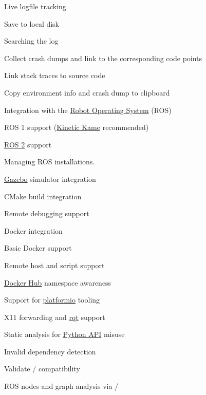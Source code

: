\begin{multicols}{2}
\begin{todolist}
\begin{todolist}
\item Live logfile tracking
\item Save to local disk
\item Searching the log
\end{todolist}
\item Collect crash dumps and link to the corresponding code points
\begin{todolist}
\item Link stack traces to source code
\item Copy environment info and crash dump to clipboard
\end{todolist}
\item Integration with the \href{https://www.ros.org}{Robot Operating System} (ROS)
\begin{todolist}
\item[\done] ROS 1 support (\href{https://wiki.ros.org/kinetic}{Kinetic Kame} recommended)
\item \href{https://github.com/ros2/ros2/wiki}{ROS 2} support
\item[\done] Managing ROS installations.
\end{todolist}
\item[\done] \href{http://gazebosim.org/}{Gazebo} simulator integration
\item CMake build integration
\item Remote debugging support
\item Docker integration
\begin{todolist}
\item[\done] Basic Docker support
\item Remote host and script support
\item \href{https://hub.docker.com}{Docker Hub} namespace awareness
\item Support for \href{https://platformio.org}{platformio} tooling
\item X11 forwarding and \href{https://wiki.ros.org/rqt}{rqt} support
\end{todolist}
\item Static analysis for \href{https://wiki.ros.org/rospy}{Python API} misuse
\begin{todolist}
\item[\done] Invalid dependency detection
\item Validate / compatibility
\item ROS nodes and graph analysis via \href{https://wiki.ros.org/rosdep}{}/\href{https://wiki.ros.org/rqt_dep}{}

\end{todolist}
\end{todolist}
\end{multicols}
